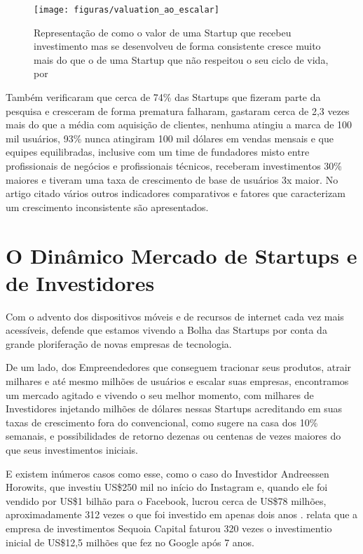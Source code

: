 \begin{figure}[!htb]
\centering
\texttt{[image: figuras/valuation\_ao\_escalar]}
\caption{Representação de como o valor de uma Startup que recebeu investimento mas se desenvolveu de forma consistente cresce muito mais do que o de uma Startup que não respeitou o seu ciclo de vida, por \cite{marmer2011startup}}
\label{Rotulo}
\end{figure}

Também verificaram que cerca de 74\% das Startups que fizeram parte da pesquisa e cresceram de forma prematura falharam, gastaram cerca de 2,3 vezes mais do que a média com aquisição de clientes, nenhuma atingiu a marca de 100 mil usuários, 93\% nunca atingiram 100 mil dólares em vendas mensais e que equipes equilibradas, inclusive com um time de fundadores misto entre profissionais de negócios e profissionais técnicos, receberam investimentos 30\% maiores e tiveram uma taxa de crescimento de base de usuários 3x maior. No artigo citado vários outros indicadores comparativos e fatores que caracterizam um crescimento inconsistente são apresentados. 

\section{O Dinâmico Mercado de Startups e de Investidores}
\label{section:o_dinamico_mercado_das_startups}

Com o advento dos dispositivos móveis e de recursos de internet cada vez mais acessíveis,  defende que estamos vivendo a Bolha das Startups por conta da grande ploriferação de novas empresas de tecnologia. 

De um lado, dos Empreendedores que conseguem tracionar seus produtos, atrair milhares e até mesmo milhões de usuários e escalar suas empresas, encontramos um mercado agitado e vivendo o seu melhor momento, com milhares de Investidores injetando milhões de dólares nessas Startups acreditando em suas taxas de crescimento fora do convencional, como  sugere na casa dos 10\% semanais, e possibilidades de retorno dezenas ou centenas de vezes maiores do que seus investimentos iniciais.

E existem inúmeros casos como esse, como o caso do Investidor Andreessen Horowits, que investiu US\$250 mil no início do Instagram e, quando ele foi vendido por US\$1 bilhão para o Facebook, lucrou cerca de US\$78 milhões, aproximadamente 312 vezes o que foi investido em apenas dois anos .  relata que a empresa de investimentos Sequoia Capital faturou 320 vezes o investimentio inicial de US\$12,5 milhões que fez no Google após 7 anos.

